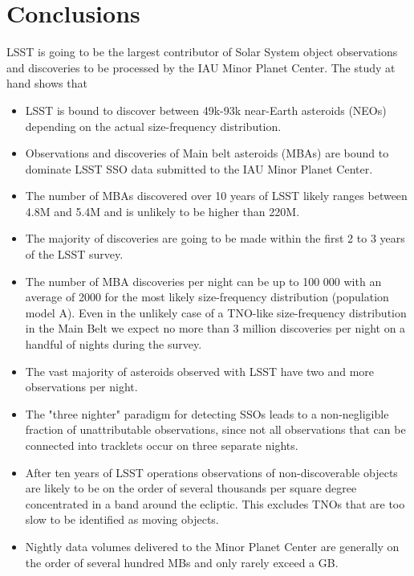\section{Conclusions} \label{sec:conclusions}

LSST is going to be the largest contributor of Solar System object observations and discoveries to be processed by the \gls{IAU} Minor Planet \gls{Center}.
The study at hand shows that
\begin{itemize}
\item \gls{LSST} is bound to discover between 49k-93k near-Earth asteroids (NEOs) depending on the actual size-frequency distribution.
\item Observations and discoveries of Main belt asteroids (MBAs) are bound to dominate \gls{LSST} \gls{SSO} data submitted to the \gls{IAU} Minor Planet \gls{Center}.
\item The number of MBAs discovered over 10 years of \gls{LSST} likely ranges between 4.8M and 5.4M and is unlikely to be higher than 220M. 
\item The majority of discoveries are going to be made within the first 2 to 3 years of the \gls{LSST} survey.
\item The number of MBA discoveries per night can be up to 100 000 with an average of 2000 for the most likely size-frequency distribution (population model A). Even in the unlikely case of a \gls{TNO}-like size-frequency distribution in the Main Belt we expect no more than 3 million discoveries per night on a handful of nights during the survey.
\item The vast majority of asteroids observed with \gls{LSST} have two and more observations per night.  
\item The "three nighter" paradigm for detecting SSOs leads to a non-negligible fraction of unattributable observations, since not all observations that can be connected into tracklets occur on three separate nights. 
\item After ten years of \gls{LSST} operations observations of non-discoverable objects are likely to be on the order of several thousands per square degree concentrated in a band around the ecliptic. This excludes TNOs that are too slow to be identified as moving objects. 
\item Nightly data volumes delivered to the Minor Planet \gls{Center} are generally on the order of several hundred MBs and only rarely exceed a \gls{GB}.
\end{itemize}
